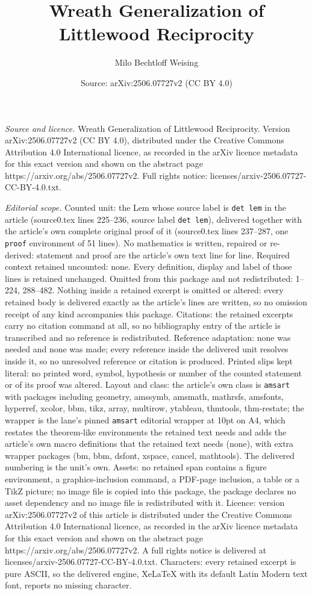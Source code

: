 \documentclass[10pt,a4paper]{amsart}
\title[Wreath Generalization of Littlewood Reciprocity]{Wreath Generalization of Littlewood Reciprocity}
\author{Milo Bechtloff Weising}
\date{Source: arXiv:2506.07727v2 (CC BY 4.0)}
\begin{document}
\maketitle

\noindent\emph{Source and licence.} Wreath Generalization of Littlewood Reciprocity. Version arXiv:2506.07727v2 (CC BY 4.0), distributed under the Creative Commons Attribution 4.0 International licence, as recorded in the arXiv licence metadata for this exact version and shown on the abstract page https://arxiv.org/abs/2506.07727v2. Full rights notice: licenses/arxiv-2506.07727-CC-BY-4.0.txt.\par\smallskip

\noindent\textit{Editorial scope.} Counted unit: the Lem whose source label is \texttt{det lem} in the article (source0.tex lines 225--236, source label \texttt{det lem}), delivered together with the article's own complete original proof of it (source0.tex lines 237--287, one \texttt{proof} environment of 51 lines). No mathematics is written, repaired or re-derived: statement and proof are the article's own text line for line. Required context retained uncounted: none. Every definition, display and label of those lines is retained unchanged. Omitted from this package and not redistributed: 1--224, 288--482. Nothing inside a retained excerpt is omitted or altered: every retained body is delivered exactly as the article's lines are written, so no omission receipt of any kind accompanies this package. Citations: the retained excerpts carry no citation command at all, so no bibliography entry of the article is transcribed and no reference is redistributed. Reference adaptation: none was needed and none was made; every reference inside the delivered unit resolves inside it, so no unresolved reference or citation is produced. Printed slips kept literal: no printed word, symbol, hypothesis or number of the counted statement or of its proof was altered. Layout and class: the article's own class is \texttt{amsart} with packages including geometry, amssymb, amsmath, mathrsfs, amsfonts, hyperref, xcolor, bbm, tikz, array, multirow, ytableau, thmtools, thm-restate; the wrapper is the lane's pinned \texttt{amsart} editorial wrapper at 10pt on A4, which restates the theorem-like environments the retained text needs and adds the article's own macro definitions that the retained text needs (none), with extra wrapper packages (bm, bbm, dsfont, xspace, cancel, mathtools). The delivered numbering is the unit's own. Assets: no retained span contains a figure environment, a graphics-inclusion command, a PDF-page inclusion, a table or a TikZ picture; no image file is copied into this package, the package declares no asset dependency and no image file is redistributed with it. Licence: version arXiv:2506.07727v2 of this article is distributed under the Creative Commons Attribution 4.0 International licence, as recorded in the arXiv licence metadata for this exact version and shown on the abstract page https://arxiv.org/abs/2506.07727v2. A full rights notice is delivered at licenses/arxiv-2506.07727-CC-BY-4.0.txt. Characters: every retained excerpt is pure ASCII, so the delivered engine, XeLaTeX with its default Latin Modern text font, reports no missing character.
\end{document}
